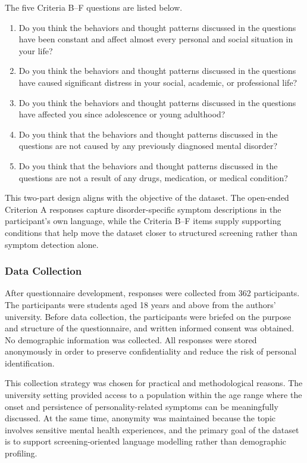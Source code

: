\documentclass{article}
\begin{document}
The five Criteria B--F questions are listed below.
\begin{enumerate}
    \item Do you think the behaviors and thought patterns discussed in the questions have been constant and affect almost every personal and social situation in your life?
    \item Do you think the behaviors and thought patterns discussed in the questions have caused significant distress in your social, academic, or professional life?
    \item Do you think the behaviors and thought patterns discussed in the questions have affected you since adolescence or young adulthood?
    \item Do you think that the behaviors and thought patterns discussed in the questions are not caused by any previously diagnosed mental disorder?
    \item Do you think that the behaviors and thought patterns discussed in the questions are not a result of any drugs, medication, or medical condition?
\end{enumerate}

This two-part design aligns with the objective of the dataset. The open-ended Criterion A responses capture disorder-specific symptom descriptions in the participant's own language, while the Criteria B--F items supply supporting conditions that help move the dataset closer to structured screening rather than symptom detection alone.

\subsubsection{Data Collection}
After questionnaire development, responses were collected from 362 participants. The participants were students aged 18 years and above from the authors' university. Before data collection, the participants were briefed on the purpose and structure of the questionnaire, and written informed consent was obtained. No demographic information was collected. All responses were stored anonymously in order to preserve confidentiality and reduce the risk of personal identification.

This collection strategy was chosen for practical and methodological reasons. The university setting provided access to a population within the age range where the onset and persistence of personality-related symptoms can be meaningfully discussed. At the same time, anonymity was maintained because the topic involves sensitive mental health experiences, and the primary goal of the dataset is to support screening-oriented language modelling rather than demographic profiling.
\end{document}
